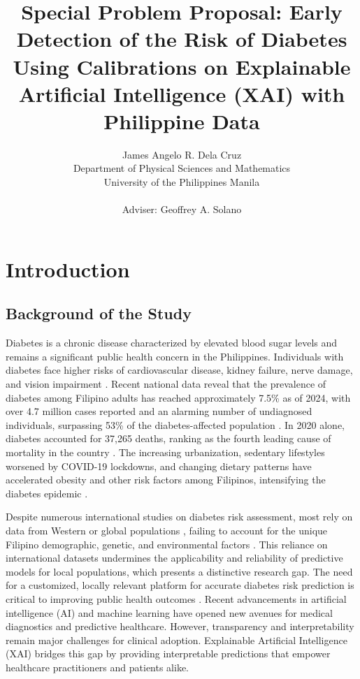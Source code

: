 \documentclass[11pt,a4paper,titlepage]{article}
\title {Special Problem Proposal: Early Detection of the Risk of Diabetes Using Calibrations on Explainable Artificial Intelligence (XAI) with Philippine Data
}
\author {James Angelo R. Dela Cruz \\ Department of Physical Sciences and Mathematics \\ University of the Philippines Manila \\ \\
Adviser: Geoffrey A. Solano}
\date{}
\let\stdsection\section
\renewcommand\section{\newpage\stdsection}
\begin{document}
\maketitle
\tableofcontents

\section{Introduction}

\subsection{Background of the Study}
Diabetes is a chronic disease characterized by elevated blood sugar levels and remains a significant public health concern in the Philippines. Individuals with diabetes face higher risks of cardiovascular disease, kidney failure, nerve damage, and vision impairment \cite{Khokhar2025}. Recent national data reveal that the prevalence of diabetes among Filipino adults has reached approximately 7.5\% as of 2024, with over 4.7 million cases reported and an alarming number of undiagnosed individuals, surpassing 53\% of the diabetes-affected population \cite{IDFPhilippines2025}. In 2020 alone, diabetes accounted for 37,265 deaths, ranking as the fourth leading cause of mortality in the country \cite{Cudis2021}. The increasing urbanization, sedentary lifestyles worsened by COVID-19 lockdowns, and changing dietary patterns have accelerated obesity and other risk factors among Filipinos, intensifying the diabetes epidemic \cite{Cando2024}.

Despite numerous international studies on diabetes risk assessment, most rely on data from Western or global populations \cite{Kiran2025}, failing to account for the unique Filipino demographic, genetic, and environmental factors \cite{Cando2024}. This reliance on international datasets undermines the applicability and reliability of predictive models for local populations, which presents a distinctive research gap. The need for a customized, locally relevant platform for accurate diabetes risk prediction is critical to improving public health outcomes \cite{Khokhar2025}. Recent advancements in artificial intelligence (AI) and machine learning have opened new avenues for medical diagnostics and predictive healthcare. However, transparency and interpretability remain major challenges for clinical adoption. Explainable Artificial Intelligence (XAI) bridges this gap by providing interpretable predictions that empower healthcare practitioners and patients alike. 
\end{document}
